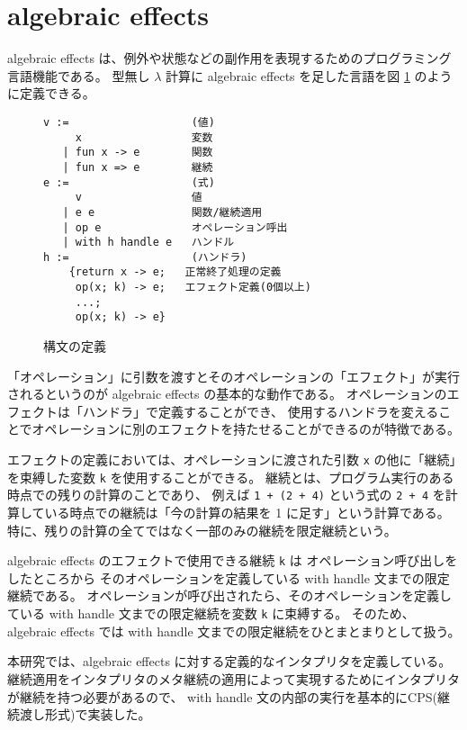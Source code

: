 \section{algebraic effects}
\label{section:algebraic effects}

algebraic effects は、例外や状態などの副作用を表現するためのプログラミング言語機能である。
型無し $\lambda$ 計算に algebraic effects を足した言語を図 \ref{figure:effects} のように定義できる。

\begin{figure}
\begin{verbatim}
v :=                   (値)
     x                 変数
   | fun x -> e        関数
   | fun x => e        継続
e :=                   (式)
     v                 値
   | e e               関数/継続適用
   | op e              オペレーション呼出
   | with h handle e   ハンドル
h :=                   (ハンドラ)
    {return x -> e;   正常終了処理の定義
     op(x; k) -> e;   エフェクト定義(0個以上)
     ...;
     op(x; k) -> e}
\end{verbatim}
\caption{構文の定義}
\label{figure:effects}
\end{figure}

「オペレーション」に引数を渡すとそのオペレーションの「エフェクト」が実行されるというのが algebraic effects の基本的な動作である。
オペレーションのエフェクトは「ハンドラ」で定義することができ、
使用するハンドラを変えることでオペレーションに別のエフェクトを持たせることができるのが特徴である。

エフェクトの定義においては、オペレーションに渡された引数 \texttt{x} の他に「継続」を束縛した変数 \texttt{k} を使用することができる。
継続とは、プログラム実行のある時点での残りの計算のことであり、
例えば \texttt{1 + (2 + 4)} という式の \texttt{2 + 4}
を計算している時点での継続は「今の計算の結果を 1 に足す」という計算である。
特に、残りの計算の全てではなく一部のみの継続を限定継続という。

algebraic effects のエフェクトで使用できる継続 \texttt{k} は
オペレーション呼び出しをしたところから
そのオペレーションを定義している with handle 文までの限定継続である。
オペレーションが呼び出されたら、そのオペレーションを定義している with handle 文までの限定継続を変数 \texttt{k} に束縛する。
そのため、algebraic effects では with handle 文までの限定継続をひとまとまりとして扱う。

本研究では、algebraic effects に対する定義的なインタプリタを定義している。
継続適用をインタプリタのメタ継続の適用によって実現するためにインタプリタが継続を持つ必要があるので、
with handle 文の内部の実行を基本的にCPS(継続渡し形式)で実装した。
